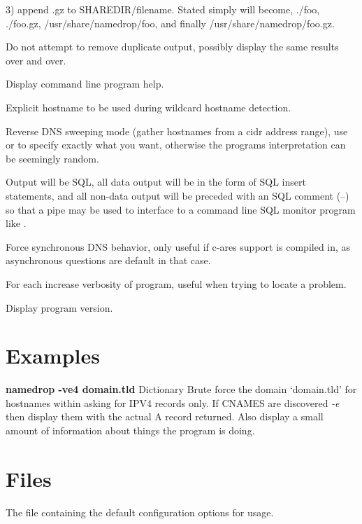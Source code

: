 \documentclass[english]{article}
\begin{document}
\begin{Description}
3) append .gz to SHAREDIR/filename. Stated simply  will become, ./foo, ./foo.gz,
/usr/share/namedrop/foo, and finally /usr/share/namedrop/foo.gz.
\item[\Opt{-F}]
Do not attempt to remove duplicate output, possibly display the same results over and over.
\item[\Opt{-h}]
Display command line program help.
\item[\OptArg{-H}{ hostname}]
Explicit hostname to be used during wildcard hostname detection.
\item[\Opt{-r}]
Reverse DNS sweeping mode (gather hostnames from a cidr address range), use  or  to specify
exactly what you want, otherwise the programs interpretation can be seemingly random.
\item[\Opt{-s}]
Output will be SQL, all data output will be in the form of SQL insert statements, and all non-data output
will be preceded with an SQL comment (--) so that a pipe may be used to interface to a command line SQL
monitor program like .
\item[\Opt{-S}]
Force synchronous DNS behavior, only useful if c-ares support is compiled in, as asynchronous questions
are default in that case.
\item[\Opt{-v}]
For each  increase verbosity of program, useful when trying to locate a problem.
\item[\Opt{-V}]
Display program version.
\end{Description}

\section{Examples}
\begin{Description}
\textbf{namedrop -ve4 domain.tld }
Dictionary Brute force the domain `domain.tld' for hostnames within asking for IPV4 records only.
If CNAMES are discovered \emph{-e} then display them with the actual A record returned. Also
display a small amount of information about things the program is doing.
\end{Description}

\section{Files}
\begin{Description}
\item[\File{namedrop.conf}] The file containing the default configuration options for usage.
\end{Description}
\end{document}
